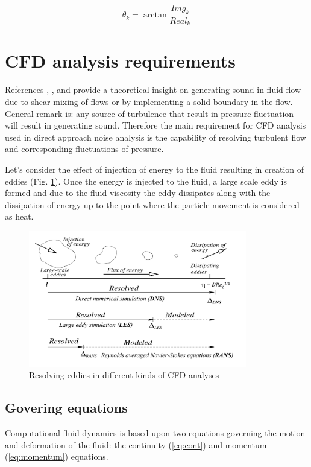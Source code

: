 \begin{equation} \label{eq:dftphase}
\theta_k = \arctan \frac{Img_k}{Real_k}
\end{equation}


\section{CFD analysis requirements} \label{cfdreq}
References \citep{Light1}, \citep{Light2}, \citep{FWH} and \citep{curle} provide a theoretical insight on generating sound in fluid flow due to shear mixing of flows or by implementing a solid boundary in the flow. General remark is: any source of turbulence that result in pressure fluctuation will result in generating sound. Therefore the main requirement for CFD analysis used in direct approach noise analysis is the capability of resolving turbulent flow and corresponding fluctuations of pressure.

Let's consider the effect of injection of energy to the fluid resulting in creation of eddies (Fig. \ref{CFDTypes}). Once the energy is injected to the fluid, a large scale eddy is formed and due to the fluid viscosity the eddy dissipates along with the dissipation of energy up to the point where the particle movement is considered as heat. 

\begin{figure}[h!]
\centering %
\includegraphics[width=0.85\textwidth]{Pictures/CFD_Types.png}
\caption{Resolving eddies in different kinds of CFD analyses}
\label{CFDTypes}
\end{figure}

\subsection{Govering equations} \label{goveq}
Computational fluid dynamics is based upon two equations governing the motion and deformation of the fluid: the continuity (\ref{eq:cont}) and momentum (\ref{eq:momentum}) equations.

